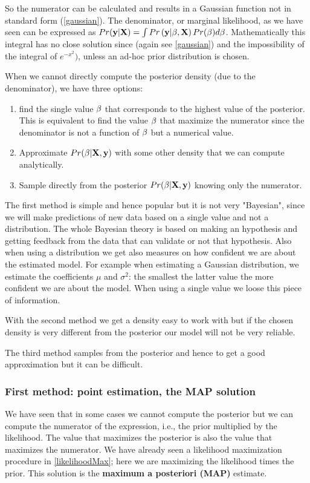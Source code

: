 So the numerator can be calculated and results in a Gaussian function not in standard form (\autoref{gaussian}). The denominator, or marginal likelihood, as we have seen can be expressed as $Pr(\mathbf{y}|\mathrm{\mathbf{X}}) = \int Pr\left(\mathbf{y}|\mathbf{\beta},\mathrm{\mathbf{X}}\right) Pr(\mathbf{\beta}) d\mathbf{\beta}$. Mathematically this integral has no close solution since (again see \autoref{gaussian}) and the impossibility of the integral of $e^{-x^2})$, unless an ad-hoc prior distribution is chosen.

When we cannot directly compute the posterior density (due to the denominator), we have three options:
\begin{enumerate}
\item find the single value $\mathbf{\beta}$ that corresponds to the highest value of the posterior. This is equivalent to find the value $\mathbf{\beta}$ that maximize the numerator since the denominator is not a function of $\mathbf{\beta}$ but a numerical value.
\item Approximate $Pr(\mathbf{\beta}|\mathrm{\mathbf{X}}, \mathbf{y})$ with some other density that we can compute analytically.
\item Sample directly from the posterior $Pr(\mathbf{\beta}|\mathrm{\mathbf{X}},\mathbf{y})$ knowing only the numerator.
\end{enumerate}

The first method is simple and hence popular but it is not very "Bayesian", since we will make predictions of new data based on a single value and not a distribution. The whole Bayesian theory is based on making an hypothesis and getting feedback from the data that can validate or not that hypothesis. Also when using a distribution we get also measures on how confident we are about the estimated model. For example when estimating a Gaussian distribution, we estimate the coefficients $\mu$ and $\sigma^2$: the smallest the latter value the more confident we are about the model. When using a single value we loose this piece of information.

With the second method we get a density easy to work with but if the chosen density is very different from the posterior our model will not be very reliable.

The third method samples from the posterior and hence to get a good approximation but it can be difficult.

\subsubsection{First method: point estimation, the MAP solution}
We have seen that in some cases we cannot compute the posterior but we can compute the numerator of the expression, i.e., the prior multiplied by the likelihood. The value that maximizes the posterior is also the value that maximizes the numerator. We have already seen a likelihood maximization procedure in \autoref{likelihoodMax}; here we are maximizing the likelihood times the prior. This solution is the \textbf{maximum a posteriori (MAP)} estimate.

